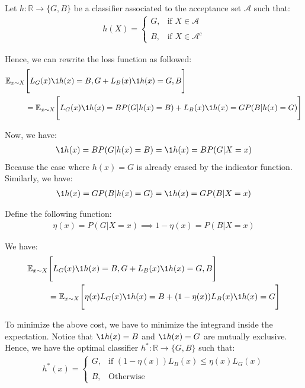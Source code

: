\begin{proof*}
    Let $h:\mathbb{R}\to \{G, B\}$ be a classifier associated to the acceptance set $\mathcal{A}$ such that:
    \begin{align*}
        h(X) = \begin{cases}
            G, & \text{if } X \in \mathcal{A} 
            \\ \\
            B, & \text{if } X \in \mathcal{A}^c
        \end{cases}
    \end{align*}

    \noindent Hence, we can rewrite the loss function as followed:
    \begin{align*}
        \mathbb{E}_{x\sim X}&\Bigg[ 
            L_G(x)\1{h(x) = B, G} + L_B(x)\1{h(x)=G, B}
        \Bigg]
        \\
        &= \mathbb{E}_{x\sim X}\Bigg[ 
            L_G(x)\1{h(x) = B}P(G|h(x)=B) + L_B(x)\1{h(x)=G}P(B|h(x)=G)
        \Bigg]
    \end{align*}

    \noindent Now, we have:
    \begin{align*}
        \1{h(x)=B}P(G|h(x)=B) = \1{h(x)=B}P(G|X=x)
    \end{align*}
    \noindent Because the case where $h(x)=G$ is already erased by the indicator function. Similarly, we have:
    \begin{align*}
        \1{h(x)=G}P(B|h(x)=G) = \1{h(x)=G}P(B|X=x)
    \end{align*}

    \noindent Define the following function:
    \begin{align*}
        \eta(x) = P(G|X=x) \implies 1 - \eta(x) = P(B|X=x)
    \end{align*}

    \noindent We have:
    \begin{align*}
        \mathbb{E}_{x\sim X}&\Bigg[ 
            L_G(x)\1{h(x) = B, G} + L_B(x)\1{h(x)=G, B}
        \Bigg] \\
        &= \mathbb{E}_{x\sim X}\Bigg[ 
            \eta(x)L_G(x)\1{h(x)=B} + (1 - \eta(x))L_B(x)\1{h(x)=G}
        \Bigg]
    \end{align*}

    \noindent To minimize the above cost, we have to minimize the integrand inside the expectation. Notice that $\1{h(x)=B}$ and $\1{h(x)=G}$ are mutually exclusive. Hence, we have the optimal classifier $h^*:\mathbb{R} \to \{G, B\}$ such that:
    \begin{align*}
        h^*(x) = \begin{cases}
            G, &\text{if } (1 - \eta(x))L_B(x) \le \eta(x) L_G(x)
            \\ \\
            B, &\text{Otherwise}
        \end{cases}
    \end{align*}


\end{proof*}
